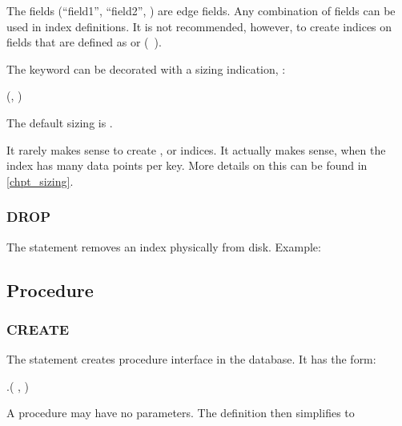The fields (``field1'', ``field2'', \etc)
are edge fields. Any combination of fields
can be used in index definitions.
It is not recommended, however,
to create indices on fields that are defined as 
or  (\eg\ ).


The  keyword can be decorated with a sizing
indication, \eg:

   
(, )

The default sizing is .

It rarely makes sense to create 
, 
 or 
 indices.
It actually makes sense,
when the index
has many data points per key.
More details on this can be found in \ref{chpt_sizing}.


\subsubsection{DROP}
The  statement removes an index physically from disk.
Example:

 

\subsection{Procedure}
\subsubsection{CREATE}
The  statement
creates procedure interface in the database.
It has the form:

 .(
                            ,
                            )
                            

A procedure may have no parameters.
The definition then simplifies to

